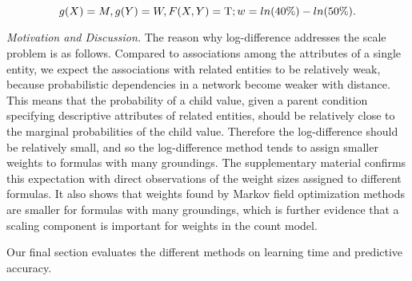 \documentclass[twoside,leqno,twocolumn]{article}
\begin{document}
\begin{small}
\[g(X)= M, g(Y) = W, F(X,Y) = \mathrm{T}; w = ln(40\%) - ln(50\%).\]
\end{small}
{\em Motivation and Discussion.} 
%
The reason why log-difference addresses the scale problem is as follows.
Compared to associations among the attributes of a single entity, we expect the associations with related entities to be relatively weak, because probabilistic dependencies in a network become weaker with distance. This means that the probability of a child value, given a parent condition specifying descriptive attributes of related entities, should be relatively close to the marginal probabilities of the child value. Therefore the log-difference should be relatively small, and so the log-difference method tends to assign smaller weights to formulas with many groundings. The supplementary material confirms this expectation with direct observations of the weight sizes assigned to different formulas. It also shows that weights found by Markov field optimization methods are smaller for formulas with many groundings, which is further evidence that a scaling component is important for weights in the count model.


%

%
Our final section evaluates the different methods on learning time and predictive accuracy.
\end{document}
